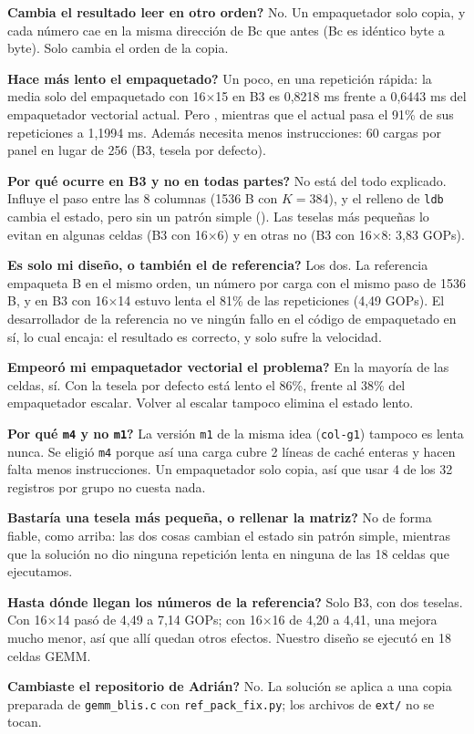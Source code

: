 \textbf{\textquestiondown Cambia el resultado leer en otro orden?} No. Un empaquetador solo copia, y cada número cae en la misma dirección de Bc que antes
(Bc es idéntico byte a byte). Solo cambia el orden de la copia.

\textbf{\textquestiondown Hace más lento el empaquetado?} Un poco, en una repetición rápida: la media solo del empaquetado con 16$\times$15 en B3 es 0,8218 ms frente a 0,6443 ms
del empaquetador vectorial actual. Pero , mientras que el actual pasa el 91\% de sus repeticiones a 1,1994 ms. Además necesita menos
instrucciones: 60 cargas por panel en lugar de 256 (B3, tesela por defecto).

\textbf{\textquestiondown Por qué ocurre en B3 y no en todas partes?} No está del todo explicado. Influye el paso entre las 8 columnas (1536 B con $K=384$), y el relleno de
\texttt{ldb} cambia el estado, pero sin un patrón simple (). Las teselas más pequeñas lo evitan en algunas celdas (B3 con 16$\times$6) y en otras no
(B3 con 16$\times$8: 3,83 GOPs).

\textbf{\textquestiondown Es solo mi diseño, o también el de referencia?} Los dos. La referencia empaqueta B en el mismo orden, un número por carga con el mismo paso de
1536 B, y en B3 con 16$\times$14 estuvo lenta el 81\% de las repeticiones (4,49 GOPs). El desarrollador de la referencia no ve ningún fallo en el código de empaquetado en sí, lo cual encaja:
el resultado es correcto, y solo sufre la velocidad.

\textbf{\textquestiondown Empeoró mi empaquetador vectorial el problema?} En la mayoría de las celdas, sí. Con la tesela por defecto está lento el 86\%, frente al 38\% del empaquetador escalar.
Volver al escalar tampoco elimina el estado lento.

\textbf{\textquestiondown Por qué \texttt{m4} y no \texttt{m1}?} La versión \texttt{m1} de la misma idea (\texttt{col-g1}) tampoco es lenta nunca. Se eligió \texttt{m4}
porque así una carga cubre 2 líneas de caché enteras y hacen falta menos instrucciones. Un empaquetador solo copia, así que usar 4 de los 32 registros
por grupo no cuesta nada.

\textbf{\textquestiondown Bastaría una tesela más pequeña, o rellenar la matriz?} No de forma fiable, como arriba: las dos cosas cambian el estado sin patrón simple, mientras que la
solución no dio ninguna repetición lenta en ninguna de las 18 celdas que ejecutamos.

\textbf{\textquestiondown Hasta dónde llegan los números de la referencia?} Solo B3, con dos teselas. Con 16$\times$14 pasó de 4,49 a 7,14 GOPs; con 16$\times$16 de 4,20 a
4,41, una mejora mucho menor, así que allí quedan otros efectos. Nuestro diseño se ejecutó en 18 celdas GEMM.

\textbf{\textquestiondown Cambiaste el repositorio de Adri\'an?} No. La solución se aplica a una copia preparada de \texttt{gemm\_blis.c} con \texttt{ref\_pack\_fix.py};
los archivos de \texttt{ext/} no se tocan.

